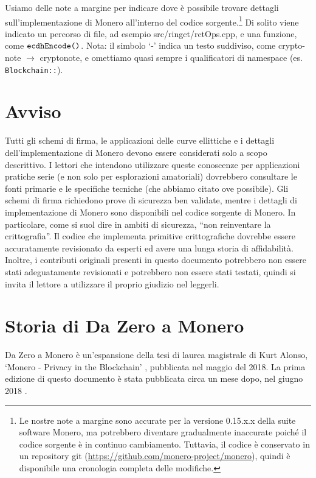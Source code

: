 Usiamo delle note a margine per indicare dove è possibile trovare dettagli sull’implementazione di Monero all’interno del codice sorgente.\footnote{Le nostre note a margine sono accurate per la versione 0.15.x.x della suite software Monero, ma potrebbero diventare gradualmente inaccurate poiché il codice sorgente è in continuo cambiamento. Tuttavia, il codice è conservato in un repository git (\url{https://github.com/monero-project/monero}), quindi è disponibile una cronologia completa delle modifiche.} Di solito viene indicato un percorso di file, ad esempio src/ringct/rctOps.cpp, e una funzione, come \(\textrm{{\tt ecdhEncode()}}\). Nota: il simbolo `-' indica un testo suddiviso, come crypto- note $\rightarrow$ cryptonote, e omettiamo quasi sempre i qualificatori di namespace (es. {\tt Blockchain::}).



\section{Avviso}

Tutti gli schemi di firma, le applicazioni delle curve ellittiche e i dettagli dell’implementazione di Monero devono essere considerati solo a scopo descrittivo. I lettori che intendono utilizzare queste conoscenze per applicazioni pratiche serie (e non solo per esplorazioni amatoriali) dovrebbero consultare le fonti primarie e le specifiche tecniche (che abbiamo citato ove possibile). Gli schemi di firma richiedono prove di sicurezza ben validate, mentre i dettagli di implementazione di Monero sono disponibili nel codice sorgente di Monero. In particolare, come si suol dire in ambiti di sicurezza, “non reinventare la crittografia”. Il codice che implementa primitive crittografiche dovrebbe essere accuratamente revisionato da esperti ed avere una lunga storia di affidabilità. Inoltre, i contributi originali presenti in questo documento potrebbero non essere stati adeguatamente revisionati e potrebbero non essere stati testati, quindi si invita il lettore a utilizzare il proprio giudizio nel leggerli.



\section{Storia di Da Zero a Monero}

Da Zero a Monero è un’espansione della tesi di laurea magistrale di Kurt Alonso, `Monero - Privacy in the Blockchain' \cite{kurt-original}, pubblicata nel maggio del 2018. La prima edizione di questo documento è stata pubblicata circa un mese dopo, nel giugno 2018 \cite{ztm-1}.

